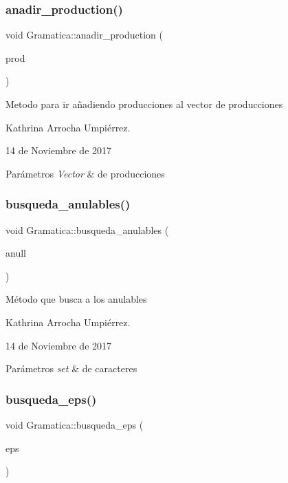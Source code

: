 \subsubsection{\texorpdfstring{anadir\+\_\+production()}{anadir\_production()}}
{\footnotesize\ttfamily void Gramatica\+::anadir\+\_\+production (\begin{DoxyParamCaption}\item[{\hyperlink{class_produccion}{Produccion}}]{prod }\end{DoxyParamCaption})}

Metodo para ir añadiendo producciones al vector de producciones

Kathrina Arrocha Umpiérrez.

14 de Noviembre de 2017 
\begin{DoxyParams}{Parámetros}
{\em Vector} & de producciones \\
\hline
\end{DoxyParams}
\mbox{\label{class_gramatica_a6d752e6f50981a562330cba09d14582b}} 
\subsubsection{\texorpdfstring{busqueda\+\_\+anulables()}{busqueda\_anulables()}}
{\footnotesize\ttfamily void Gramatica\+::busqueda\+\_\+anulables (\begin{DoxyParamCaption}\item[{set$<$ char $>$ \&}]{anull }\end{DoxyParamCaption})}

Método que busca a los anulables

Kathrina Arrocha Umpiérrez.

14 de Noviembre de 2017 
\begin{DoxyParams}{Parámetros}
{\em set} & de caracteres \\
\hline
\end{DoxyParams}
\mbox{\label{class_gramatica_a5bed20d9bb4c86052b3765b025128884}} 
\subsubsection{\texorpdfstring{busqueda\+\_\+eps()}{busqueda\_eps()}}
{\footnotesize\ttfamily void Gramatica\+::busqueda\+\_\+eps (\begin{DoxyParamCaption}\item[{set$<$ char $>$ \&}]{eps }\end{DoxyParamCaption})}

